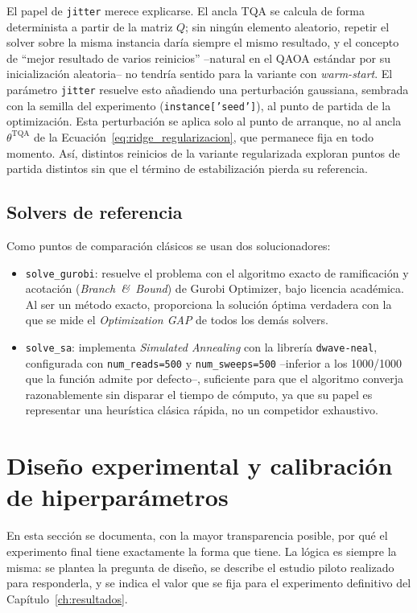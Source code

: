 El papel de \texttt{jitter} merece explicarse. El ancla TQA se calcula de forma determinista a partir de la matriz $Q$; sin ningún elemento aleatorio, repetir el solver sobre la misma instancia daría siempre el mismo resultado, y el concepto de ``mejor resultado de varios reinicios'' --natural en el QAOA estándar por su inicialización aleatoria-- no tendría sentido para la variante con \textit{warm-start}. El parámetro \texttt{jitter} resuelve esto añadiendo una perturbación gaussiana, sembrada con la semilla del experimento (\texttt{instance['seed']}), al punto de partida de la optimización. Esta perturbación se aplica solo al punto de arranque, no al ancla $\theta^{\text{TQA}}$ de la Ecuación~\eqref{eq:ridge_regularizacion}, que permanece fija en todo momento. Así, distintos reinicios de la variante regularizada exploran puntos de partida distintos sin que el término de estabilización pierda su referencia.

\subsection{Solvers de referencia}

Como puntos de comparación clásicos se usan dos solucionadores:

\begin{itemize}
    \item \texttt{solve\_gurobi}: resuelve el problema con el algoritmo exacto de ramificación y acotación (\textit{Branch~\&~Bound}) de Gurobi Optimizer, bajo licencia académica. Al ser un método exacto, proporciona la solución óptima verdadera con la que se mide el \textit{Optimization GAP} de todos los demás solvers.
    \item \texttt{solve\_sa}: implementa \textit{Simulated Annealing} con la librería \texttt{dwave-neal}, configurada con \texttt{num\_reads=500} y \texttt{num\_sweeps=500} --inferior a los 1000/1000 que la función admite por defecto--, suficiente para que el algoritmo converja razonablemente sin disparar el tiempo de cómputo, ya que su papel es representar una heurística clásica rápida, no un competidor exhaustivo.
\end{itemize}

\section{Diseño experimental y calibración de hiperparámetros}
\label{sec:calibracion}

En esta sección se documenta, con la mayor transparencia posible, por qué el experimento final tiene exactamente la forma que tiene. La lógica es siempre la misma: se plantea la pregunta de diseño, se describe el estudio piloto realizado para responderla, y se indica el valor que se fija para el experimento definitivo del Capítulo~\ref{ch:resultados}.

